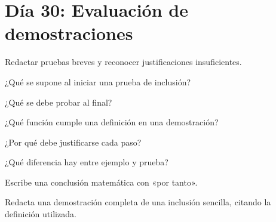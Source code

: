 \section{Día 30: Evaluación de demostraciones}

\begin{lesson}[id=dia-30-lectura,weight=0]

Redactar pruebas breves y reconocer justificaciones insuficientes.

\end{lesson}

\begin{activity}[id=dia-30-corta-01,type=short,weight=1]

¿Qué se supone al iniciar una prueba de inclusión?

\end{activity}

\begin{activity}[id=dia-30-corta-02,type=short,weight=1]

¿Qué se debe probar al final?

\end{activity}

\begin{activity}[id=dia-30-corta-03,type=short,weight=1]

¿Qué función cumple una definición en una demostración?

\end{activity}

\begin{activity}[id=dia-30-corta-04,type=short,weight=1]

¿Por qué debe justificarse cada paso?

\end{activity}

\begin{activity}[id=dia-30-corta-05,type=short,weight=1]

¿Qué diferencia hay entre ejemplo y prueba?

\end{activity}

\begin{activity}[id=dia-30-corta-06,type=short,weight=1]

Escribe una conclusión matemática con «por tanto».

\end{activity}

\begin{activity}[id=dia-30-desarrollo-01,type=long,weight=2]

Redacta una demostración completa de una inclusión sencilla, citando la definición utilizada.

\end{activity}

